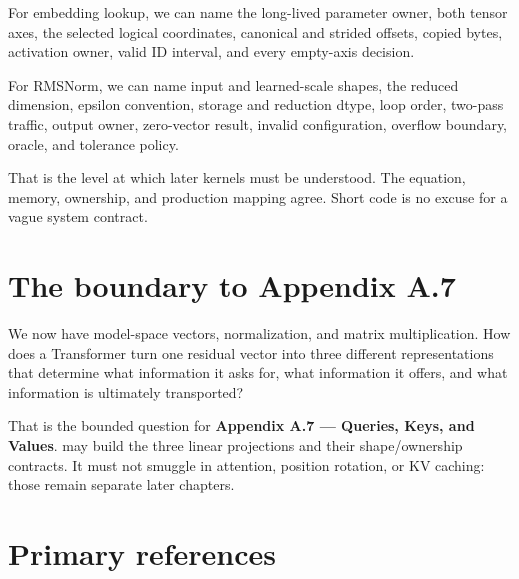 For embedding lookup, we can name the long-lived parameter owner, both
tensor axes, the selected logical coordinates, canonical and strided
offsets, copied bytes, activation owner, valid ID interval, and every
empty-axis decision.

For RMSNorm, we can name input and learned-scale shapes, the reduced
dimension, epsilon convention, storage and reduction dtype, loop order,
two-pass traffic, output owner, zero-vector result, invalid
configuration, overflow boundary, oracle, and tolerance policy.

That is the level at which later kernels must be understood. The
equation, memory, ownership, and production mapping agree. Short code is
no excuse for a vague system contract.

\section{The boundary to Appendix A.7}\label{the-boundary-to-chapter-8}

We now have model-space vectors, normalization, and matrix
multiplication. How does a Transformer turn one residual vector into
three different representations that determine what information it asks
for, what information it offers, and what information is ultimately
transported?

That is the bounded question for \textbf{Appendix A.7 --- Queries, Keys,
and Values}.  may build the three linear projections and their
shape/ownership contracts. It must not smuggle in attention, position
rotation, or KV caching: those remain separate later chapters.

\section{Primary references}\label{primary-references-2}

